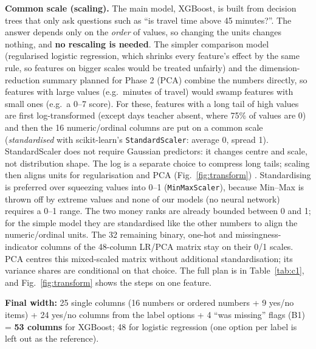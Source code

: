\documentclass[conference,a4paper]{IEEEtran}
\newcommand{\var}[1]{\texttt{#1}}
\begin{document}
\textbf{Common scale (scaling).} The main model, XGBoost, is built from decision trees that only ask questions such as ``is travel time above 45 minutes?''. The answer depends only on the \emph{order} of values, so changing the units changes nothing, and \textbf{no rescaling is needed}. The simpler comparison model (regularised logistic regression, which shrinks every feature's effect by the same rule, so features on bigger scales would be treated unfairly) and the dimension-reduction summary planned for Phase 2 (PCA) combine the numbers directly, so features with large values (e.g.\ minutes of travel) would swamp features with small ones (e.g.\ a 0--7 score). For these, features with a long tail of high values are first log-transformed (except days teacher absent, where 75\% of values are 0) and then the 16 numeric/ordinal columns are put on a common scale (\emph{standardised} with scikit-learn's \var{StandardScaler}: average 0, spread 1). StandardScaler does not require Gaussian predictors: it changes centre and scale, not distribution shape. The log is a separate choice to compress long tails; scaling then aligns units for regularisation and PCA (Fig.~\ref{fig:transform}) \cite{standardscaler}. Standardising is preferred over squeezing values into 0--1 (\var{MinMaxScaler}), because Min--Max is thrown off by extreme values and none of our models (no neural network) requires a 0--1 range. The two money ranks are already bounded between 0 and 1; for the simple model they are standardised like the other numbers to align the numeric/ordinal units. The 32 remaining binary, one-hot and missingness-indicator columns of the 48-column LR/PCA matrix stay on their 0/1 scales. PCA centres this mixed-scaled matrix without additional standardisation; its variance shares are conditional on that choice. The full plan is in Table~\ref{tab:c1}, and Fig.~\ref{fig:transform} shows the steps on one feature.

\textbf{Final width:} 25 single columns (16 numbers or ordered numbers + 9 yes/no items) + 24 yes/no columns from the label options + 4 ``was missing'' flags (B1) = \textbf{53 columns} for XGBoost; 48 for logistic regression (one option per label is left out as the reference).
\end{document}
